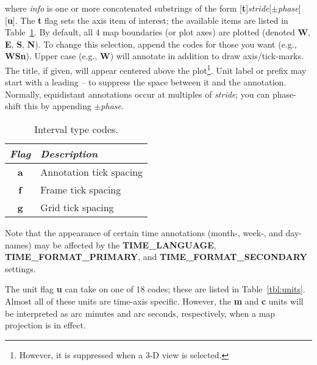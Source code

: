 \noindent
where \emph{info} is one or more concatenated substrings of the form
[\textbf{t}]\emph{stride}[$\pm$\emph{phase}][\textbf{u}].  The \textbf{t} flag sets the axis item of interest; the
available items are listed in Table~\ref{tbl:inttype}.  By
default, all 4 map boundaries (or plot axes) are plotted (denoted \textbf{W}, \textbf{E}, \textbf{S},
\textbf{N}).  To change this selection, append the codes for those you want
(e.g., \textbf{WSn}).  Upper case (e.g., \textbf{W}) will annotate in addition to
draw axis/tick-marks.  The title, if given, will appear centered above the plot\footnote{However,
it is suppressed when a 3-D view is selected.}.  Unit label or prefix may start with a
leading -- to suppress the space between it and the annotation.  Normally, equidistant annotations
occur at multiples of \emph{stride}; you can phase-shift this by appending $\pm$\emph{phase}.
\begin{table}[H]
\centering
\begin{tabular}{|c|l|} \hline
\emph{Flag}	& \emph{Description} \\ \hline
\textbf{a}	&	Annotation tick spacing \\ \hline
\textbf{f}	&	Frame tick spacing \\ \hline
\textbf{g}	&	Grid tick spacing \\ \hline
\end{tabular}
\caption{Interval type codes.}
\label{tbl:inttype}
\end{table}
\noindent
Note that the appearance of certain time annotations (month-, week-, and day-names) may be affected
by the \textbf{TIME\_LANGUAGE}, \textbf{TIME\_FORMAT\_PRIMARY}, and \textbf{TIME\_FORMAT\_SECONDARY} settings.

The unit flag \textbf{u} can take on one of 18 codes; these are listed in  Table~\ref{tbl:units}.
Almost all of these units are time-axis specific.  However, the \textbf{m} and \textbf{c} units will be
interpreted as arc minutes and arc seconds, respectively, when a map projection is in effect.

